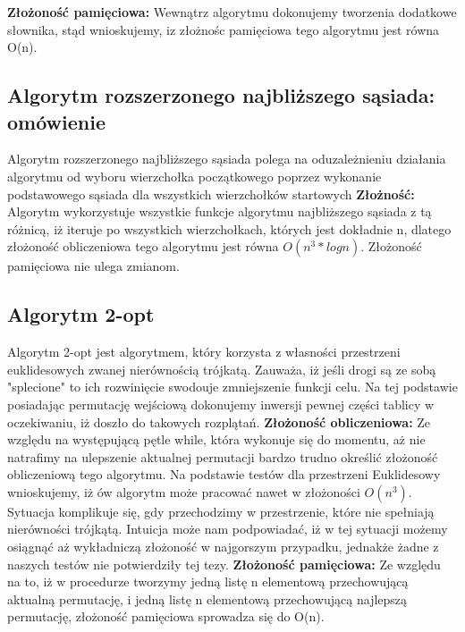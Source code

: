   \textbf{Złożoność pamięciowa: }
    Wewnątrz algorytmu dokonujemy tworzenia dodatkowe słownika, stąd wnioskujemy, iz złożnośc pamięciowa tego algorytmu jest równa O(n).
\subsection{Algorytm rozszerzonego najbliższego sąsiada: omówienie}
  Algorytm rozszerzonego najbliższego sąsiada polega na oduzależnieniu działania algorytmu od wyboru wierzchołka początkowego poprzez wykonanie podstawowego sąsiada dla wszystkich wierzchołków startowych
  \textbf{Złożność: }
    Algorytm wykorzystuje wszystkie funkcje algorytmu najbliższego sąsiada z tą różnicą, iż iteruje po wszystkich wierzchołkach, których jest dokładnie n, dlatego złożoność obliczeniowa tego algorytmu jest równa $O(n^3*logn)$. Złożoność pamięciowa nie ulega zmianom.
\subsection{Algorytm 2-opt}
  Algorytm 2-opt jest algorytmem, który korzysta z własności przestrzeni euklidesowych zwanej nierównością trójkatą. Zauważa, iż jeśli drogi są ze sobą "splecione" to ich rozwinięcie swodouje zmniejszenie funkcji celu. Na tej podstawie posiadając permutację wejściową dokonujemy inwersji pewnej części tablicy w oczekiwaniu, iż doszło do takowych rozplątań.
    \textbf{Złożoność obliczeniowa:}
      Ze względu na występującą pętle while, która wykonuje się do momentu, aż nie natrafimy na ulepszenie aktualnej permutacji bardzo trudno określić złożoność obliczeniową tego algorytmu. Na podstawie testów dla przestrzeni Euklidesowy wnioskujemy, iż ów algorytm może pracować nawet w złożoności $O(n^{3})$. Sytuacja komplikuje się, gdy przechodzimy w przestrzenie, które nie spełniają nierówności trójkątą. Intuicja może nam podpowiadać, iż w tej sytuacji możemy osiągnąć aż wykładniczą złożoność w najgorszym przypadku, jednakże żadne z naszych testów nie potwierdziły tej tezy.
    \textbf{Złożoność pamięciowa:}
      Ze względu na to, iż w procedurze tworzymy jedną listę n elementową przechowującą aktualną permutację, i jedną listę n elementową przechowującą najlepszą permutację, złożoność pamięciowa sprowadza się do O(n).